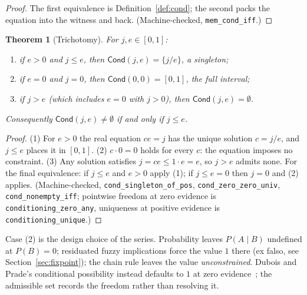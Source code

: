 \documentclass[11pt,a4paper]{article}
\newtheorem{theorem}{Theorem}[section]
\newcommand{\Cond}{\mathsf{Cond}}
\begin{document}
\begin{proof}
The first equivalence is Definition~\ref{def:cond}; the second packs
the equation into the witness and back.
(Machine-checked, \texttt{mem\_cond\_iff}.)
\end{proof}

\begin{theorem}[Trichotomy]
\label{thm:trichotomy}
For $j, e \in [0,1]$:
\begin{enumerate}[label=\textup{(\arabic*)},nosep]
\item if $e > 0$ and $j \leq e$, then
  $\Cond(j,e) = \{j/e\}$, a singleton;
\item if $e = 0$ and $j = 0$, then $\Cond(0,0) = [0,1]$, the full
  interval;
\item if $j > e$ (which includes $e = 0$ with $j > 0$), then
  $\Cond(j,e) = \emptyset$.
\end{enumerate}
Consequently $\Cond(j,e) \neq \emptyset$ if and only if $j \leq e$.
\end{theorem}

\begin{proof}
(1) For $e > 0$ the real equation $ce = j$ has the unique solution
$c = j/e$, and $j \leq e$ places it in $[0,1]$.
(2) $c \cdot 0 = 0$ holds for every $c$: the equation imposes no
constraint.
(3) Any solution satisfies
$j = ce \leq 1 \cdot e = e$, so $j > e$ admits none.
For the final equivalence: if $j \leq e$ and $e > 0$ apply (1); if
$j \leq e = 0$ then $j = 0$ and (2) applies.
(Machine-checked, \texttt{cond\_singleton\_of\_pos},
\texttt{cond\_zero\_zero\_univ}, \texttt{cond\_nonempty\_iff};
pointwise freedom at zero evidence is
\texttt{conditioning\_zero\_any}, uniqueness at positive evidence is
\texttt{conditioning\_unique}.)
\end{proof}

Case (2) is the design choice of the series.
Probability leaves $P(A \mid B)$ undefined at $P(B) = 0$; residuated
fuzzy implications force the value $1$ there
(ex falso, see Section~\ref{sec:fixpoint});
the chain rule leaves the value \emph{unconstrained}.
Dubois and Prade's conditional possibility instead defaults to $1$ at
zero evidence~\cite{dubois1988}; the admissible set records the
freedom rather than resolving it.
\end{document}

